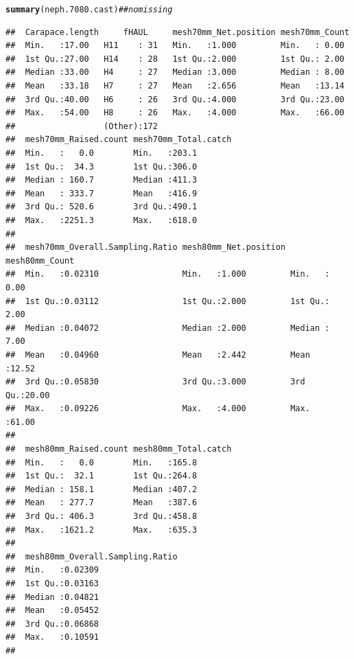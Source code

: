 \documentclass[12pt]{article}\usepackage[]{graphicx}\usepackage[]{color}
\makeatletter
\newcommand{\hlcom}[1]{\textcolor[rgb]{0.678,0.584,0.686}{\textit{#1}}}%
\newcommand{\hlstd}[1]{\textcolor[rgb]{0.345,0.345,0.345}{#1}}%
\newcommand{\hlkwd}[1]{\textcolor[rgb]{0.737,0.353,0.396}{\textbf{#1}}}%
\newenvironment{kframe}{%
 \def\at@end@of@kframe{}%
 \ifinner\ifhmode%
  \def\at@end@of@kframe{\end{minipage}}%
  \begin{minipage}{\columnwidth}%
 \fi\fi%
 \def\FrameCommand##1{\hskip\@totalleftmargin \hskip-\fboxsep
 \colorbox{shadecolor}{##1}\hskip-\fboxsep
     \hskip-\linewidth \hskip-\@totalleftmargin \hskip\columnwidth}%
 \MakeFramed {\advance\hsize-\width
   \@totalleftmargin\z@ \linewidth\hsize
   \@setminipage}}%
 {\par\unskip\endMakeFramed%
 \at@end@of@kframe}
\newenvironment{knitrout}{}{} %
\makeatother
\begin{document}
\begin{knitrout}
\begin{kframe}
\begin{alltt}
\hlkwd{summary}\hlstd{(neph.7080.cast)} \hlcom{## no missing}
\end{alltt}
\begin{verbatim}
##  Carapace.length     fHAUL     mesh70mm_Net.position mesh70mm_Count 
##  Min.   :17.00   H11    : 31   Min.   :1.000         Min.   : 0.00  
##  1st Qu.:27.00   H14    : 28   1st Qu.:2.000         1st Qu.: 2.00  
##  Median :33.00   H4     : 27   Median :3.000         Median : 8.00  
##  Mean   :33.18   H7     : 27   Mean   :2.656         Mean   :13.14  
##  3rd Qu.:40.00   H6     : 26   3rd Qu.:4.000         3rd Qu.:23.00  
##  Max.   :54.00   H8     : 26   Max.   :4.000         Max.   :66.00  
##                  (Other):172                                        
##  mesh70mm_Raised.count mesh70mm_Total.catch
##  Min.   :   0.0        Min.   :203.1       
##  1st Qu.:  34.3        1st Qu.:306.0       
##  Median : 160.7        Median :411.3       
##  Mean   : 333.7        Mean   :416.9       
##  3rd Qu.: 520.6        3rd Qu.:490.1       
##  Max.   :2251.3        Max.   :618.0       
##                                            
##  mesh70mm_Overall.Sampling.Ratio mesh80mm_Net.position mesh80mm_Count 
##  Min.   :0.02310                 Min.   :1.000         Min.   : 0.00  
##  1st Qu.:0.03112                 1st Qu.:2.000         1st Qu.: 2.00  
##  Median :0.04072                 Median :2.000         Median : 7.00  
##  Mean   :0.04960                 Mean   :2.442         Mean   :12.52  
##  3rd Qu.:0.05830                 3rd Qu.:3.000         3rd Qu.:20.00  
##  Max.   :0.09226                 Max.   :4.000         Max.   :61.00  
##                                                                       
##  mesh80mm_Raised.count mesh80mm_Total.catch
##  Min.   :   0.0        Min.   :165.8       
##  1st Qu.:  32.1        1st Qu.:264.8       
##  Median : 158.1        Median :407.2       
##  Mean   : 277.7        Mean   :387.6       
##  3rd Qu.: 406.3        3rd Qu.:458.8       
##  Max.   :1621.2        Max.   :635.3       
##                                            
##  mesh80mm_Overall.Sampling.Ratio
##  Min.   :0.02309                
##  1st Qu.:0.03163                
##  Median :0.04821                
##  Mean   :0.05452                
##  3rd Qu.:0.06868                
##  Max.   :0.10591                
## 
\end{verbatim}
\end{kframe}
\end{knitrout}
\end{document}

